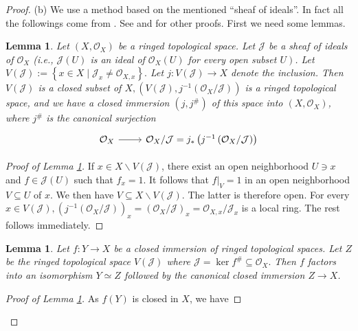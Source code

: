 \documentclass{amsart}
\newtheorem{lm}[theorem]{Lemma}
\theoremstyle{remark}\newtheorem{rmk}[theorem]{Remark}
\begin{document}
\begin{proof}
	(b) We use a method based on the mentioned ``sheaf of ideals''. In fact all the followings come from \cite[Ch. 2, Prop. 3.20, P. 47]{LIU}. See \cite[Ch. 3, Th. 3.42, P. 84]{GW} and \cite[P. 32]{BAG} for other proofs. First we need some lemmas.
	\begin{lm}
		\label{l13}
		Let $\left(X, \mathcal{O}_{X}\right)$ be a ringed topological space. Let $\mathcal{J}$ be a sheaf of ideals of $\mathcal{O}_{X}$ (i.e., $\mathcal{J}(U)$ is an ideal of $\mathcal{O}_{X}(U)$ for every open subset $\left.U\right)$. Let $V(\mathcal{J}):=\left\{x \in X \mid \mathcal{J}_{x} \neq \mathcal{O}_{X, x}\right\} .$ Let $j: V(\mathcal{J}) \rightarrow X$ denote the inclusion. Then $V(\mathcal{J})$ is a closed subset of $X,\left(V(\mathcal{J}), j^{-1}\left(\mathcal{O}_{X} / \mathcal{J}\right)\right)$ is a ringed topological space, and we have a closed immersion $\left(j, j^{\#}\right)$ of this space into $\left(X, \mathcal{O}_{X}\right)$, where $j^{\#}$ is the canonical surjection
		\begin{equation*}
			\begin{tikzcd}
				\mathcal{O}_{X} \arrow[r] & \mathcal{O}_{X} / \mathcal{J}=j_{*}\left(j^{-1}\left(\mathcal{O}_{X} / \mathcal{J}\right)\right)
			\end{tikzcd}
		\end{equation*}
	\end{lm}
	\begin{proof}[Proof of Lemma \ref*{l13}]
		If $x \in X \backslash V(\mathcal{J})$, there exist an open neighborhood $U \ni x$ and $f \in \mathcal{J}(U)$ such that $f_{x}=1$. It follows that $\left.f\right|_{V}=1$ in an open neighborhood $V \subseteq U$ of $x$. We then have $V \subseteq X \backslash V(\mathcal{J})$. The latter is therefore open. For every $x \in V(\mathcal{J}),\left(j^{-1}\left(\mathcal{O}_{X} / \mathcal{J}\right)\right)_{x}=\left(\mathcal{O}_{X} / \mathcal{J}\right)_{x}=\mathcal{O}_{X, x} / \mathcal{J}_{x}$ is a local ring.
		The rest follows immediately.
	\end{proof}
	\begin{lm}
		\label{l14}
		Let $f: Y \rightarrow X$ be a closed immersion of ringed topological spaces. Let $Z$ be the ringed topological space $V(\mathcal{J})$ where $\mathcal{J}=\ker f^{\#} \subseteq \mathcal{O}_{X} .$ Then $f$ factors into an isomorphism $Y \simeq Z$ followed by the canonical closed immersion $Z \rightarrow X$.
	\end{lm}
	\begin{proof}[Proof of Lemma \ref*{l14}]
		As $f(Y)$ is closed in $X$, we have

\end{proof}
\end{proof}
\end{document}
